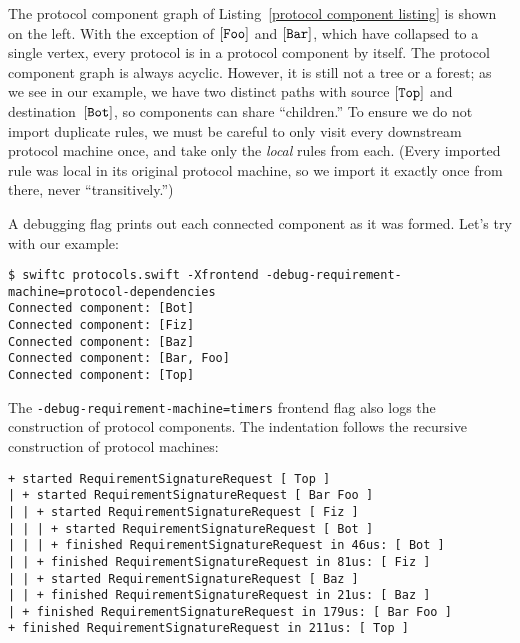 \documentclass[../generics]{subfiles}
\begin{document}
\begin{wrapfigure}{l}{3.5cm}
\end{wrapfigure}

The protocol component graph of Listing~\ref{protocol component listing} is shown on the left. With the exception of $[\texttt{Foo}]$ and $[\texttt{Bar}]$, which have collapsed to a single vertex, every protocol is in a protocol component by itself. The protocol component graph is always acyclic. However, it is still not a tree or a forest; as we see in our example, we have two distinct paths with source $[\texttt{Top}]$ and destination~$[\texttt{Bot}]$, so components can share ``children.'' To ensure we do not import duplicate rules, we must be careful to only visit every downstream protocol machine once, and take only the \emph{local} rules from each. (Every imported rule was local in its original protocol machine, so we import it exactly once from there, never ``transitively.'')

A debugging flag prints out each connected component as it was formed. Let's try with our example:
\begin{Verbatim}[fontsize=\footnotesize,numbers=none]
$ swiftc protocols.swift -Xfrontend -debug-requirement-machine=protocol-dependencies
Connected component: [Bot]
Connected component: [Fiz]
Connected component: [Baz]
Connected component: [Bar, Foo]
Connected component: [Top]
\end{Verbatim}

The
\texttt{-debug-requirement-machine=timers} frontend flag also logs the construction of protocol components. The indentation follows the recursive construction of protocol machines:
\begin{Verbatim}[fontsize=\footnotesize,numbers=none]
+ started RequirementSignatureRequest [ Top ]
| + started RequirementSignatureRequest [ Bar Foo ]
| | + started RequirementSignatureRequest [ Fiz ]
| | | + started RequirementSignatureRequest [ Bot ]
| | | + finished RequirementSignatureRequest in 46us: [ Bot ]
| | + finished RequirementSignatureRequest in 81us: [ Fiz ]
| | + started RequirementSignatureRequest [ Baz ]
| | + finished RequirementSignatureRequest in 21us: [ Baz ]
| + finished RequirementSignatureRequest in 179us: [ Bar Foo ]
+ finished RequirementSignatureRequest in 211us: [ Top ]
\end{Verbatim}
\end{document}
